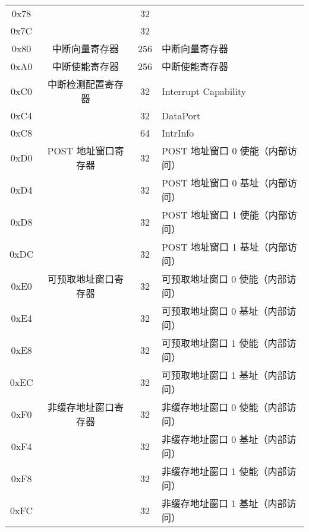 \begin{longtable}{|c|c|c|l|}
  0x78 &                       &  32 &                                                   \\*
  0x7C &                       &  32 &                                                   \\ \hline
  0x80 & 中断向量寄存器        & 256 & 中断向量寄存器                                    \\ \hline
  0xA0 & 中断使能寄存器        & 256 & 中断使能寄存器                                    \\ \hline
  0xC0 & 中断检测配置寄存器    &  32 & Interrupt Capability                              \\*
  0xC4 &                       &  32 & DataPort                                          \\*
  0xC8 &                       &  64 & IntrInfo                                          \\ \hline
  0xD0 & POST 地址窗口寄存器   &  32 & POST 地址窗口 0 使能（内部访问）                  \\*
  0xD4 &                       &  32 & POST 地址窗口 0 基址（内部访问）                  \\*
  0xD8 &                       &  32 & POST 地址窗口 1 使能（内部访问）                  \\*
  0xDC &                       &  32 & POST 地址窗口 1 基址（内部访问）                  \\ \hline
  0xE0 & 可预取地址窗口寄存器  &  32 & 可预取地址窗口 0 使能（内部访问）                 \\*
  0xE4 &                       &  32 & 可预取地址窗口 0 基址（内部访问）                 \\*
  0xE8 &                       &  32 & 可预取地址窗口 1 使能（内部访问）                 \\*
  0xEC &                       &  32 & 可预取地址窗口 1 基址（内部访问）                 \\ \hline
  0xF0 & 非缓存地址窗口寄存器  &  32 & 非缓存地址窗口 0 使能（内部访问）                 \\*
  0xF4 &                       &  32 & 非缓存地址窗口 0 基址（内部访问）                 \\*
  0xF8 &                       &  32 & 非缓存地址窗口 1 使能（内部访问）                 \\*
  0xFC &                       &  32 & 非缓存地址窗口 1 基址（内部访问）                 \\ \hline
\end{longtable}

